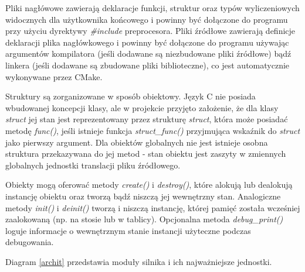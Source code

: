 Pliki nagłówowe zawierają deklaracje funkcji, struktur oraz typów wyliczeniowych widocznych dla użytkownika końcowego i powinny być dołączone do programu przy użyciu dyrektywy \textit{\#include} preprocesora.
Pliki źródłowe zawierają definicje deklaracji plika nagłówkowego i powinny być dołączone do programu używając argumentów kompilatora (jeśli dodawane są niezbudowane pliki źródłowe) bądź linkera (jeśli dodawane są zbudowane pliki biblioteczne), co jest automatycznie wykonywane przez CMake.

Struktury są zorganizowane w sposób obiektowy.
Język C nie posiada wbudowanej koncepcji klasy, ale w projekcie przyjęto założenie, że dla klasy \textit{struct} jej stan jest reprezentowany przez strukturę \textit{struct}, która może posiadać metodę \textit{func()}, jeśli istnieje funkcja \textit{struct\_func()} przyjmująca wskaźnik do \textit{struct} jako pierwszy argument.
Dla obiektów globalnych nie jest istnieje osobna struktura przekazywana do jej metod - stan obiektu jest zaszyty w zmiennych globalnych jednostki translacji pliku źródłowego.

Obiekty mogą oferować metody \textit{create()} i \textit{destroy()}, które alokują lub dealokują instancję obiektu oraz tworzą bądź niszczą jej wewnętrzny stan.
Analogiczne metody \textit{init()} i \textit{deinit()} tworzą i niszczą instancję, której pamięć została wcześniej zaalokowaną (np. na stosie lub w tablicy).
Opcjonalna metoda \textit{debug\_print()} loguje informacje o wewnętrznym stanie instancji użyteczne podczas debugowania.

Diagram \ref{archit} przedstawia moduły silnika i ich najważniejsze jednostki.


